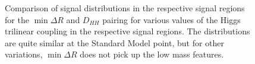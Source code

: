 \begin{figure}[ht]

\centering
{}

\caption{\label{fig:pairing-signal} 
Comparison of signal distributions in the respective signal regions for the $\min\Delta R$ and 
$D_{HH}$ pairing for various values of the Higgs trilinear coupling in the respective signal regions. The 
distributions are quite similar at the Standard Model point, but for other variations, $\min\Delta R$ does not 
pick up the low mass features.}
\end{figure}


